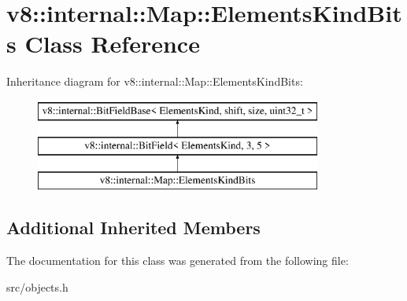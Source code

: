 \hypertarget{classv8_1_1internal_1_1_map_1_1_elements_kind_bits}{}\section{v8\+:\+:internal\+:\+:Map\+:\+:Elements\+Kind\+Bits Class Reference}
\label{classv8_1_1internal_1_1_map_1_1_elements_kind_bits}
Inheritance diagram for v8\+:\+:internal\+:\+:Map\+:\+:Elements\+Kind\+Bits\+:\begin{figure}[H]
\begin{center}
\leavevmode
\includegraphics[height=3.000000cm]{classv8_1_1internal_1_1_map_1_1_elements_kind_bits}
\end{center}
\end{figure}
\subsection*{Additional Inherited Members}


The documentation for this class was generated from the following file\+:\begin{DoxyCompactItemize}
\item 
src/objects.\+h\end{DoxyCompactItemize}
